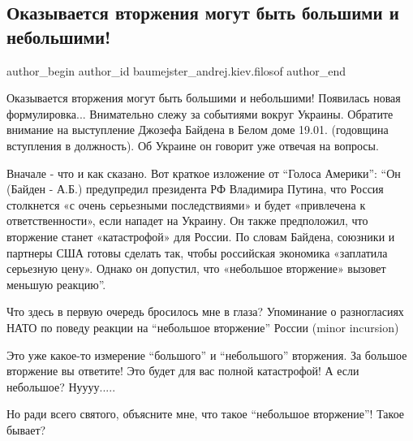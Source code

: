  
 
 
 
 
 
\subsection{Оказывается вторжения могут быть большими и небольшими!}
\label{sec:20_01_2022.fb.baumejster_andrej.kiev.filosof.1.vtorzhenie_analiz_bajden}
 
\ifcmt
 author_begin
   author_id baumejster_andrej.kiev.filosof
 author_end
\fi

Оказывается вторжения могут быть большими и небольшими! Появилась новая
формулировка... Внимательно слежу за событиями вокруг Украины. Обратите
внимание на выступление Джозефа Байдена в Белом доме 19.01. (годовщина
вступления в должность). Об Украине он говорит уже отвечая на вопросы. 

Вначале - что и как сказано. Вот краткое изложение от \enquote{Голоса Америки}: \enquote{Он
(Байден - А.Б.) предупредил президента РФ Владимира Путина, что Россия
столкнется «с очень серьезными последствиями» и будет «привлечена к
ответственности», если нападет на Украину. Он также предположил, что вторжение
станет «катастрофой» для России. По словам Байдена, союзники и партнеры США
готовы сделать так, чтобы российская экономика «заплатила серьезную цену».
Однако он допустил, что «небольшое вторжение» вызовет меньшую реакцию}.

Что здесь в первую очередь бросилось мне в глаза? Упоминание о разногласиях
НАТО по поведу реакции на \enquote{небольшое вторжение} России (minor incursion)

Это уже какое-то измерение \enquote{большого} и \enquote{небольшого} вторжения. За большое
вторжение вы ответите! Это будет для вас полной катастрофой! А если небольшое?
Нуууу..... 

Но ради всего святого, объясните мне, что такое \enquote{небольшое вторжение}!
Такое бывает? 

